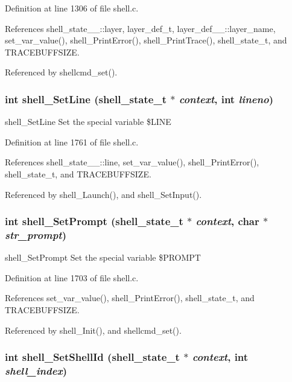 Definition at line 1306 of file shell.c.

References shell\_\-state\_\-\_\-::layer, layer\_\-def\_\-t, layer\_\-def\_\-\_\-::layer\_\-name, set\_\-var\_\-value(), shell\_\-Print\-Error(), shell\_\-Print\-Trace(), shell\_\-state\_\-t, and TRACEBUFFSIZE.

Referenced by shellcmd\_\-set().
\subsubsection{\setlength{\rightskip}{0pt plus 5cm}int shell\_\-Set\-Line ({\bf shell\_\-state\_\-t} $\ast$ {\em context}, int {\em lineno})}\label{shell_8h_a30}


shell\_\-Set\-Line Set the special variable \$LINE 

Definition at line 1761 of file shell.c.

References shell\_\-state\_\-\_\-::line, set\_\-var\_\-value(), shell\_\-Print\-Error(), shell\_\-state\_\-t, and TRACEBUFFSIZE.

Referenced by shell\_\-Launch(), and shell\_\-Set\-Input().
\subsubsection{\setlength{\rightskip}{0pt plus 5cm}int shell\_\-Set\-Prompt ({\bf shell\_\-state\_\-t} $\ast$ {\em context}, char $\ast$ {\em str\_\-prompt})}\label{shell_8h_a27}


shell\_\-Set\-Prompt Set the special variable \$PROMPT 

Definition at line 1703 of file shell.c.

References set\_\-var\_\-value(), shell\_\-Print\-Error(), shell\_\-state\_\-t, and TRACEBUFFSIZE.

Referenced by shell\_\-Init(), and shellcmd\_\-set().
\subsubsection{\setlength{\rightskip}{0pt plus 5cm}int shell\_\-Set\-Shell\-Id ({\bf shell\_\-state\_\-t} $\ast$ {\em context}, int {\em shell\_\-index})}\label{shell_8h_a29}


